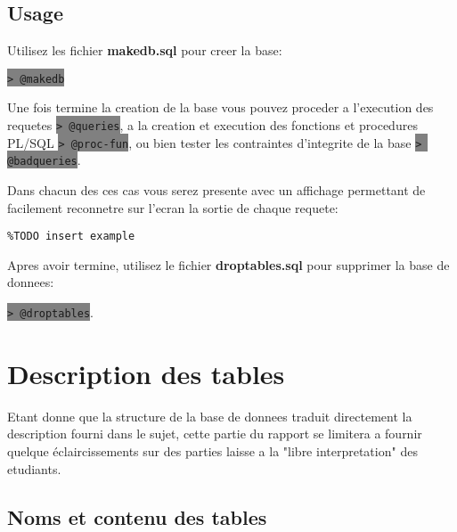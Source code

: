 \documentclass[twoside,openright,a4paper,11pt,french]{article}
\begin{document}
\subsection{Usage}
Utilisez les fichier {\bf makedb.sql} pour creer la base:
\begin{center}
\colorbox{gray}{\lstinline[basicstyle=\ttfamily\color{black}]|> @makedb|}
\end{center}
Une fois termine la creation de la base vous pouvez proceder a l'execution des
requetes
\colorbox{gray}{\lstinline[basicstyle=\ttfamily\color{black}]|> @queries|},
a la creation et execution des fonctions et procedures PL/SQL
\colorbox{gray}{\lstinline[basicstyle=\ttfamily\color{black}]|> @proc-fun|},
ou bien tester les contraintes d'integrite de la base
\colorbox{gray}{\lstinline[basicstyle=\ttfamily\color{black}]|> @badqueries|}.

\smallbreak
Dans chacun des ces cas vous serez presente avec un affichage permettant de
facilement reconnetre sur l'ecran la sortie de chaque requete:

\begin{lstlisting}
%TODO insert example
\end{lstlisting}

Apres avoir termine, utilisez le fichier {\bf droptables.sql} pour supprimer
la base de donnees:
\begin{center}
\colorbox{gray}{\lstinline[basicstyle=\ttfamily\color{black}]|> @droptables|}.
\end{center}

\section{Description des tables}
Etant donne que la structure de la base de donnees traduit directement la
description fourni dans le sujet, cette partie du rapport se limitera a fournir
quelque éclaircissements sur des parties laisse a la "libre interpretation" des
etudiants.

\subsection{Noms et contenu des tables}
\end{document}
